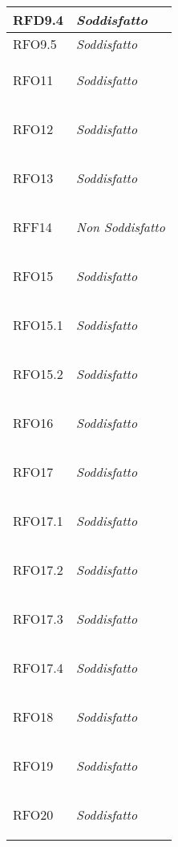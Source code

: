 \begin{longtable}{|>{\centering}m{5cm}|m{5cm}<{\centering}|}
    \hypertarget{RFD9.4}{RFD9.4} & \textit{Soddisfatto}\\ \hline
   
    \hypertarget{RFO9.5}{RFO9.5} & \textit{Soddisfatto}\\ \hline
   
    \hypertarget{RFO11}{RFO11} & \textit{Soddisfatto}\\ \hline
   
    \hypertarget{RFO12}{RFO12} & \textit{Soddisfatto}\\ \hline
   
    \hypertarget{RFO13}{RFO13} & \textit{Soddisfatto}\\ \hline
   
    \hypertarget{RFF14}{RFF14} & \textit{Non Soddisfatto}\\ \hline
   
    \hypertarget{RFO15}{RFO15} & \textit{Soddisfatto}\\ \hline
   
    \hypertarget{RFO15.1}{RFO15.1} & \textit{Soddisfatto}\\ \hline
   
    \hypertarget{RFO15.2}{RFO15.2} & \textit{Soddisfatto}\\ \hline
   
    \hypertarget{RFO16}{RFO16} & \textit{Soddisfatto}\\ \hline
   
    \hypertarget{RFO17}{RFO17} & \textit{Soddisfatto}\\ \hline
   
    \hypertarget{RFO17.1}{RFO17.1} & \textit{Soddisfatto}\\ \hline
   
    \hypertarget{RFO17.2}{RFO17.2} & \textit{Soddisfatto}\\ \hline
   
    \hypertarget{RFO17.3}{RFO17.3} & \textit{Soddisfatto}\\ \hline
   
    \hypertarget{RFO17.4}{RFO17.4} & \textit{Soddisfatto}\\ \hline
   
    \hypertarget{RFO18}{RFO18} & \textit{Soddisfatto}\\ \hline
   
    \hypertarget{RFO19}{RFO19} & \textit{Soddisfatto}\\ \hline
   
    \hypertarget{RFO20}{RFO20} & \textit{Soddisfatto}\\ \hline
   

\end{longtable}
